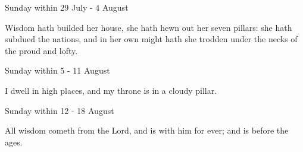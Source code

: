 \begin{multicols}{2}
\begin{inhead}
Sunday within 29 July - 4 August
\end{inhead}\par\noindent
Wisdom hath builded her house, {\dag} she hath hewn out her seven pillars: she hath subdued the nations, and in her own might hath she trodden under the necks of the proud and lofty.\\

\columnbreak

\begin{inhead}
Sunday within 5 - 11 August
\end{inhead}\par\noindent
I dwell {\dag} in high places, and my throne is in a cloudy pillar.
\begin{inhead}
Sunday within 12 - 18 August
\end{inhead}\par\noindent
All wisdom {\dag} cometh from the Lord, and is with him for ever; and is before the ages.


\end{multicols}
